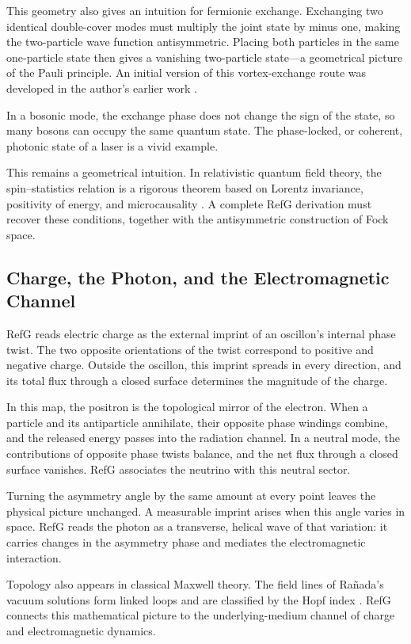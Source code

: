 \documentclass[11pt,a4paper]{article}
\begin{document}
This geometry also gives an intuition for fermionic exchange. Exchanging two identical double-cover modes must multiply the joint state by minus one, making the two-particle wave function antisymmetric. Placing both particles in the same one-particle state then gives a vanishing two-particle state---a geometrical picture of the Pauli principle. An initial version of this vortex-exchange route was developed in the author's earlier work \citep{lotishvili2026b}.

In a bosonic mode, the exchange phase does not change the sign of the state, so many bosons can occupy the same quantum state. The phase-locked, or coherent, photonic state of a laser is a vivid example.

This remains a geometrical intuition. In relativistic quantum field theory, the spin--statistics relation is a rigorous theorem based on Lorentz invariance, positivity of energy, and microcausality \citep{pauli1940}. A complete RefG derivation must recover these conditions, together with the antisymmetric construction of Fock space.

\subsection{Charge, the Photon, and the Electromagnetic Channel}

RefG reads electric charge as the external imprint of an oscillon's internal phase twist. The two opposite orientations of the twist correspond to positive and negative charge. Outside the oscillon, this imprint spreads in every direction, and its total flux through a closed surface determines the magnitude of the charge.

In this map, the positron is the topological mirror of the electron. When a particle and its antiparticle annihilate, their opposite phase windings combine, and the released energy passes into the radiation channel. In a neutral mode, the contributions of opposite phase twists balance, and the net flux through a closed surface vanishes. RefG associates the neutrino with this neutral sector.

Turning the asymmetry angle by the same amount at every point leaves the physical picture unchanged. A measurable imprint arises when this angle varies in space. RefG reads the photon as a transverse, helical wave of that variation: it carries changes in the asymmetry phase and mediates the electromagnetic interaction.

Topology also appears in classical Maxwell theory. The field lines of Rañada's vacuum solutions form linked loops and are classified by the Hopf index \citep{ranada1989}. RefG connects this mathematical picture to the underlying-medium channel of charge and electromagnetic dynamics.
\end{document}
